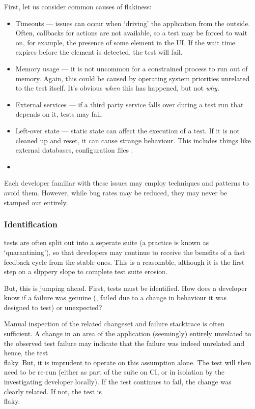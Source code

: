First, let us consider common causes of flakiness:
\begin{itemize}
	\item Timeouts --- issues can occur when {\lq}driving{\rq} the application from the outside. Often, callbacks for actions are not available, so a test may be forced to wait on, for example, the presence of some element in the UI. If the wait time expires before the element is detected, the test will fail.
	\item Memory usage --- it is not uncommon for a constrained process to run out of memory. Again, this could be caused by operating system priorities unrelated to the test itself. It's obvious \textit{when} this has happened, but not \textit{why}.
	\item External services --- if a third party service falls over during a test run that depends on it, tests may fail.
	\item Left-over state --- static state can affect the execution of a test. If it is not cleaned up and reset, it can cause strange behaviour. This includes things like external databases, configuration files \etc.
	\item {}
\end{itemize}

Each developer familiar with these issues may employ techniques and patterns to avoid them. However, while bug rates may be reduced, they may never be stamped out entirely.

\subsubsection{Identification}

\flaky tests are often split out into a seperate suite (a practice is known as {\lq}quarantining{\rq}), so that developers may continue to receive the benefits of a fast feedback cycle from the stable ones. This is a reasonable, although it is the first step on a slippery slope to complete test suite erosion.

But, this is jumping ahead. First, \flaky tests must be identified. How does a developer know if a failure was genuine (\ie, failed due to a change in behaviour it was designed to test) or unexpected?

Manual inspection of the related changeset and failure stacktrace is often sufficient. A change in an area of the application (seemingly) entirely unrelated to the observed test failure may indicate that the failure was indeed unrelated and hence, the test \\flaky. But, it is imprudent to operate on this assumption alone. The test will then need to be re-run (either as part of the suite on CI, or in isolation by the investigating developer locally). If the test continues to fail, the change was clearly related. If not, the test is \\flaky.

